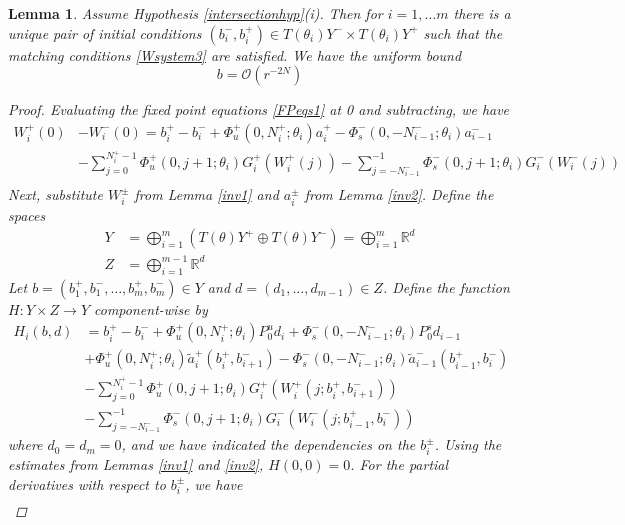 \documentclass[12pt]{article}
\def\R{{\mathbb R}}
\newtheorem{lemma}{Lemma}
\begin{document}
\begin{lemma}\label{inv3t}
Assume Hypothesis \ref{intersectionhyp}(i). Then for $i = 1, \dots m$ there is a unique pair of initial conditions $(b_i^-, b_i^+) \in T(\theta_i) Y^- \times T(\theta_i) Y^+$ such that the matching conditions \eqref{Wsystem3} are satisfied. We have the uniform bound
\begin{equation}\label{bboundt}
b = \mathcal{O}(r^{-2N})
\end{equation}

\begin{proof}
Evaluating the fixed point equations \eqref{FPeqs1} at 0 and subtracting, we have
\begin{align*}
W_i^+(0) &- W_i^-(0) = b_i^+ - b_i^- 
+ \Phi_u^+(0, N_i^+; \theta_i) a_i^+ - \Phi_s^-(0, -N_{i-1}^-; \theta_i) a_{i-1}^- \\
&- \sum_{j = 0}^{N_i^+-1} \Phi_u^+(0, j+1; \theta_i) G_i^+(W_i^+(j)) 
- \sum_{j = -N_{i-1}^-}^{-1} \Phi_s^-(0, j+1; \theta_i) G_i^-(W_i^-(j)) \\
\end{align*}
Next, substitute $W_i^\pm$ from Lemma \ref{inv1} and $a_i^\pm$ from Lemma \ref{inv2}. Define the spaces
\begin{align}\label{spaceYt}
Y &= \bigoplus_{i=1}^m (T(\theta) Y^+ \oplus T(\theta) Y^-) = \bigoplus_{i=1}^m \R^d \\
Z &= \bigoplus_{i=1}^{m-1} \R^d
\end{align}
Let $b = (b_1^+, b_1^-, \dots, b_m^+, b_m^-) \in Y$ and $d = (d_1, \dots, d_{m-1}) \in Z$. Define the function $H: Y \times Z \rightarrow Y$ component-wise by
\begin{align*}
H_i(b, d) &= 
 b_i^+ - b_i^- + \Phi_u^+(0, N_i^+; \theta_i) P_0^u d_i + \Phi_s^-(0, -N_{i-1}^-; \theta_i) P_0^s d_{i-1} \\
&+ \Phi_u^+(0, N_i^+; \theta_i) \tilde{a}_i^+(b_i^+, b_{i+1}^-) 
- \Phi_s^-(0, -N_{i-1}^-; \theta_i) \tilde{a}_{i-1}^-(b_{i-1}^+, b_i^-) \\
&- \sum_{j = 0}^{N_i^+-1} \Phi_u^+(0, j+1; \theta_i) G_i^+(W_i^+(j; b_i^+, b_{i+1}^-)) \\
&- \sum_{j = -N_{i-1}^-}^{-1} \Phi_s^-(0, j+1; \theta_i) G_i^-(W_i^-(j; b_{i-1}^+, b_i^-))
\end{align*}
where $d_0 = d_m = 0$, and we have indicated the dependencies on the $b_i^\pm$. Using the estimates from Lemmas \ref{inv1} and \ref{inv2}, $H(0, 0) = 0$. For the partial derivatives with respect to $b_i^\pm$, we have
\begin{align*}

\end{align*}
\end{proof}
\end{lemma}
\end{document}
